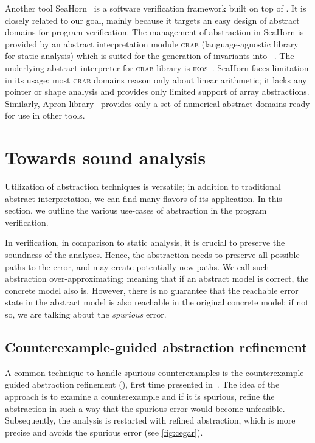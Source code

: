 Another tool SeaHorn~\cite{Gurfinkel2015} is a software verification framework
built on top of \llvm.  It is closely related to our goal, mainly because it
targets an easy design of abstract domains for program verification. The
management of abstraction in SeaHorn is provided by an abstract interpretation
module \textsc{crab} (language-agnostic library for static analysis) which is
suited for the generation of invariants into \llvm~\cite{Gershuni2019}. The
underlying abstract interpreter for \textsc{crab} library is
\textsc{ikos}~\cite{Ikos}. SeaHorn faces limitation in its usage: most
\textsc{crab} domains reason only about linear arithmetic; it lacks any pointer
or shape analysis and provides only limited support of array abstractions.
Similarly, Apron library~\cite{Jeannet2009} provides only a set of numerical
abstract domains ready for use in other tools.

\section{Towards sound analysis}
\label{sec:techniques}

Utilization of abstraction techniques is versatile; in addition to traditional
abstract interpretation, we can find many flavors of its application. In this
section, we outline the various use-cases of abstraction in the program
verification.

In verification, in comparison to static analysis, it is crucial to preserve
the soundness of the analyses. Hence, the abstraction needs to preserve all
possible paths to the error, and may create potentially new paths. We call such
abstraction over-approximating; meaning that if an abstract model is correct,
the concrete model also is.  However, there is no guarantee that the reachable
error state in the abstract model is also reachable in the original concrete
model; if not so, we are talking about the \emph{spurious} error.

\subsection{Counterexample-guided abstraction refinement}

A common technique to handle spurious coun\-ter\-examples is the
coun\-ter\-example-guided abstraction refinement (\cegar), first time presented
in~\cite{Clarke2000}. The idea of the \cegar approach is to examine a
counterexample and if it is spurious, refine the abstraction in such a way that
the spurious error would become unfeasible. Subsequently, the analysis is
restarted with refined abstraction, which is more precise and avoids the
spurious error (see \autoref{fig:cegar}).

